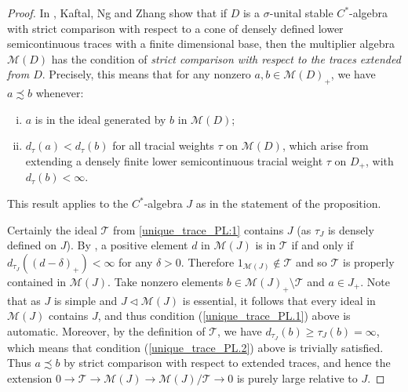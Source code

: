 \documentclass[reqno]{amsart}
\theoremstyle{definition}
\theoremstyle{remark}
\numberwithin{equation}{section}
\theoremstyle{definition}
\newcommand{\calM}{\mathcal{M}}
\newcommand{\calT}{\mathcal{T}}
\begin{document}
\begin{proof} 
In \cite[Theorem 5.3]{multiplier_strict_comparison}, Kaftal, Ng and Zhang show that if $D$ is a $\sigma$-unital stable $C^*$-algebra with strict comparison with respect to a cone of densely defined lower semicontinuous traces with a finite dimensional base, then the multiplier algebra $\mathcal M(D)$ has the condition of \emph{strict comparison with respect to the traces extended from $D$}. Precisely, this means that for any nonzero $a, b\in \calM(D)_{+}$, we have $a\precsim b$ whenever: 
\begin{enumerate}[(i)] 
\item $a$ is in the ideal generated by $b$ in $\calM(D)$;\label{unique_trace_PL.1}
\item $d_{\tau} (a) < d_{\tau} (b)$ for all tracial weights $\tau$ on $\calM(D)$, which arise from extending a densely finite lower semicontinuous tracial weight $\tau$ on $D_+$, with $d_{\tau} (b) < \infty$. \label{unique_trace_PL.2}
\end{enumerate} 
This result applies to the $C^*$-algebra $J$ as in the statement of the proposition. 

Certainly the ideal $\mathcal T$ from \eqref{unique_trace_PL:1} contains $J$ (as $\tau_J$ is densely defined on $J$). By \cite[Lemma 2.6]{sc_KNZ}, a positive element $d$ in $\calM(J)$ is in $\calT$ if and only if $d_{\tau_{J}}((d-\delta)_{+})< \infty$ for any $\delta>0$. Therefore $1_{\calM(J)}\notin \calT$ and so $\calT$ is properly contained in $\calM(J)$. Take nonzero elements $b\in \calM(J)_{+}\setminus \calT$ and $a\in J_{+}$. Note that as $J$ is simple and $J\lhd \calM(J)$ is essential, it follows that every ideal in $\calM(J)$ contains $J$, and thus condition (\ref{unique_trace_PL.1}) above is automatic. Moreover, by the definition of $\calT$, we have $d_{\tau_{J}}(b) \geq \tau_{J}(b) = \infty$, which means that condition (\ref{unique_trace_PL.2}) above is trivially satisfied. Thus $a\precsim b$ by strict comparison with respect to extended traces, and hence the extension $0\to \calT\to \calM(J)\to \calM(J)/\calT\to 0$ is purely large relative to $J$. 
\end{proof} 


\end{document}
